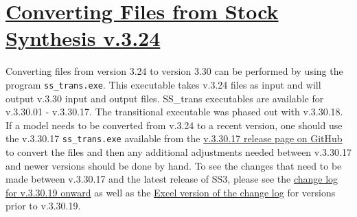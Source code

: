 \hypertarget{ConvIssues}{}
\section[Converting Files from Stock Synthesis v.3.24]{\protect\hyperlink{ConvIssues}{Converting Files from Stock Synthesis v.3.24}}
Converting files from version 3.24 to version 3.30 can be performed by using the program \texttt{ss\_trans.exe}. This executable takes v.3.24 files as input and will output v.3.30 input and output files. SS\_trans executables are available for v.3.30.01 - v.3.30.17. The transitional executable was phased out with v.3.30.18. If a model needs to be converted from v.3.24 to a recent version, one should use the v.3.30.17 \texttt{ss\_trans.exe} available from the \href{https://github.com/nmfs-ost/ss3-source-code/releases/tag/v3.30.17}{v.3.30.17 release page on GitHub} to convert the files and then any additional adjustments needed between v.3.30.17 and newer versions should be done by hand. To see the changes that need to be made between v.3.30.17 and the latest release of SS3, please see the \href{https://github.com/orgs/nmfs-ost/projects/11}{change log for v.3.30.19 onward} as well as the \href{https://github.com/nmfs-ost/ss3-source-code/blob/v3.30.19/Change_log_for_SS_3.30.xlsx?raw=true}{Excel version of the change log} for versions prior to v.3.30.19.

